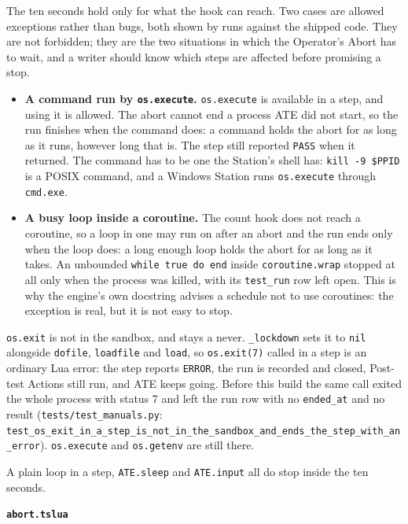 The ten seconds hold only for what the hook can reach. Two cases are allowed exceptions rather than
bugs, both shown by runs against the shipped code. They are not forbidden; they are the two
situations in which the Operator's Abort has to wait, and a writer should know which steps are
affected before promising a stop.

\begin{itemize}
  \item \textbf{A command run by \texttt{os.execute}.} \texttt{os.execute} is available in a step,
    and using it is allowed. The abort cannot end a process ATE did not start, so the run finishes
    when the command does: a command holds the abort for as long as it runs, however long that is.
    The step still reported \texttt{PASS} when it returned. The command has to be one the Station's
    shell has: \texttt{kill -9 \$PPID} is a POSIX command, and a Windows Station runs
    \texttt{os.execute} through \texttt{cmd.exe}.
  \item \textbf{A busy loop inside a coroutine.} The count hook does not reach a coroutine, so a
    loop in one may run on after an abort and the run ends only when the loop does: a long enough
    loop holds the abort for as long as it takes. An unbounded \texttt{while true do end} inside
    \texttt{coroutine.wrap} stopped at all only when the process was killed, with its
    \texttt{test\_run} row left open. This is why the engine's own docstring advises a schedule
    not to use coroutines: the exception is real, but it is not easy to stop.
\end{itemize}

\texttt{os.exit} is not in the sandbox, and stays a never. \texttt{\_lockdown} sets it to
\texttt{nil} alongside \texttt{dofile}, \texttt{loadfile} and \texttt{load}, so
\texttt{os.exit(7)} called in a step is an ordinary Lua error: the step reports \texttt{ERROR}, the
run is recorded and closed, Post-test Actions still run, and ATE keeps going. Before this build the
same call exited the whole process with status 7 and left the run row with no \texttt{ended\_at} and
no result (\texttt{tests/\allowbreak{}test\_\allowbreak{}manuals.py}:
\texttt{test\_\allowbreak{}os\_\allowbreak{}exit\_\allowbreak{}in\_\allowbreak{}a\_\allowbreak{}step\_\allowbreak{}is\_\allowbreak{}not\_\allowbreak{}in\_\allowbreak{}the\_\allowbreak{}sandbox\_\allowbreak{}and\_\allowbreak{}ends\_\allowbreak{}the\_\allowbreak{}step\_\allowbreak{}with\_\allowbreak{}an\_\allowbreak{}error}). \texttt{os.execute} and
\texttt{os.getenv} are still there.

A plain loop in a step, \texttt{ATE.sleep} and \texttt{ATE.input} all do stop inside the ten
seconds.

\noindent\textbf{\texttt{abort.tslua}}\par


